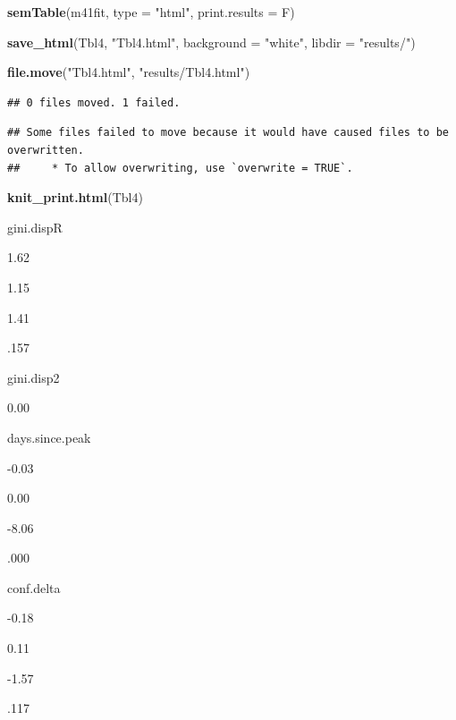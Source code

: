 \documentclass[
]{article}
\newenvironment{Shaded}{\begin{snugshade}}{\end{snugshade}}
\newcommand{\DataTypeTok}[1]{\textcolor[rgb]{0.13,0.29,0.53}{#1}}
\newcommand{\KeywordTok}[1]{\textcolor[rgb]{0.13,0.29,0.53}{\textbf{#1}}}
\newcommand{\NormalTok}[1]{#1}
\newcommand{\StringTok}[1]{\textcolor[rgb]{0.31,0.60,0.02}{#1}}
\begin{document}
\begin{Shaded}
\begin{Highlighting}[]
\KeywordTok{semTable}\NormalTok{(m41fit, }\DataTypeTok{type =} \StringTok{"html"}\NormalTok{, }\DataTypeTok{print.results =}\NormalTok{ F)}
\end{Highlighting}
\end{Shaded}

\begin{Shaded}
\begin{Highlighting}[]
\KeywordTok{save_html}\NormalTok{(Tbl4, }\StringTok{"Tbl4.html"}\NormalTok{, }\DataTypeTok{background =} \StringTok{"white"}\NormalTok{, }\DataTypeTok{libdir =} \StringTok{"results/"}\NormalTok{)}
 
\KeywordTok{file.move}\NormalTok{(}\StringTok{"Tbl4.html"}\NormalTok{, }\StringTok{"results/Tbl4.html"}\NormalTok{)}
\end{Highlighting}
\end{Shaded}

\begin{verbatim}
## 0 files moved. 1 failed.
\end{verbatim}

\begin{verbatim}
## Some files failed to move because it would have caused files to be overwritten. 
##     * To allow overwriting, use `overwrite = TRUE`.
\end{verbatim}

\begin{Shaded}
\begin{Highlighting}[]
\KeywordTok{knit_print.html}\NormalTok{(Tbl4)}
\end{Highlighting}
\end{Shaded}

gini.dispR

1.62

1.15

1.41

.157

gini.disp2

0.00

days.since.peak

-0.03

0.00

-8.06

.000

conf.delta

-0.18

0.11

-1.57

.117
\end{document}
